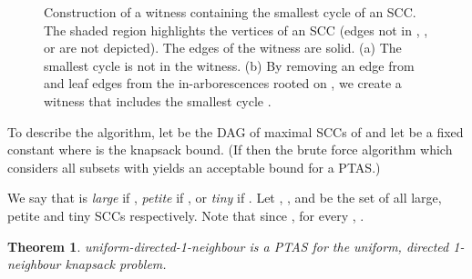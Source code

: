 \documentclass[12pt]{article}
\newtheorem{theorem}{Theorem}
\begin{document}
\begin{figure}[tb]
\centering
{}
\caption{Construction of a witness containing the smallest cycle
of an SCC.  The shaded region highlights the vertices of an
SCC (edges not in , , or  are not depicted).  The edges of the witness are solid.  (a) The smallest
cycle  is not in the witness.  (b) By removing an edge from
 and leaf edges from the in-arborescences rooted on , we
create a witness that includes the smallest cycle .}
\label{fig:1-neighbour-structure}
\end{figure}






To describe the algorithm, let  be the DAG of maximal
SCCs of  and let  be a fixed constant where  is
the knapsack bound. (If 
then the brute force algorithm which considers all subsets 
with  yields an acceptable bound for a PTAS.)

We say that  is {\em large} if ,
{\em petite} if , or {\em tiny} if .
Let , , and  be the set of all large, petite and tiny SCCs
respectively.
Note that since , for every , .



\begin{center}
\end{center}



\begin{theorem} \label{thm:1-neighbour-ptas} {\sc
uniform-directed-1-neighbour} is a PTAS for the uniform, directed
1-neighbour knapsack problem.
\end{theorem}
\end{document}
